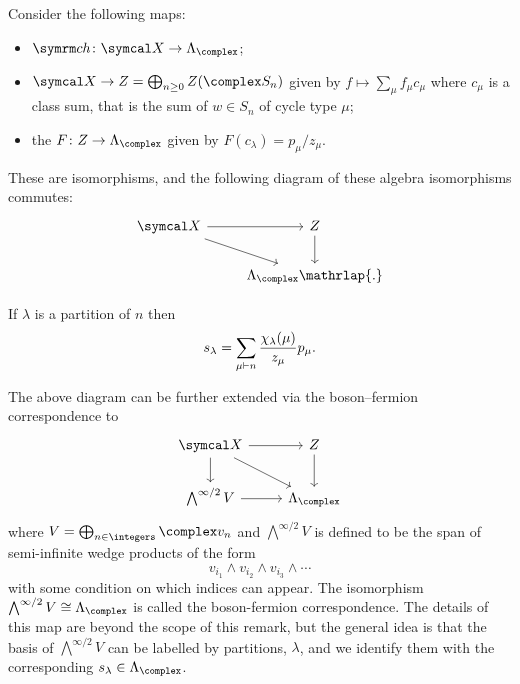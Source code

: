 \begin{thm}{}{}
    Consider the following maps:
    \begin{itemize}
        \item \(\ch \colon \classFunctions \to \Lambda_{\complex}\);
        \item \(\classFunctions \to Z = \bigoplus_{n \ge 0} Z(\complex S_n)\) given by \(f \mapsto \sum_\mu f_\mu c_\mu\) where \(c_\mu\) is a class sum, that is the sum of \(w \in S_n\) of cycle type \(\mu\);
        \item the  \(F \colon Z \to \Lambda_{\complex}\) given by \(F(c_\lambda) = p_\mu/z_\mu\).
    \end{itemize}
    These are isomorphisms, and the following diagram of these algebra isomorphisms commutes:
    \begin{equation}
        \begin{tikzcd}
            \classFunctions \arrow[r] \arrow[dr] & Z \arrow[d]\\
            & \Lambda_{\complex}\mathrlap{.}
        \end{tikzcd}
    \end{equation}
\end{thm}

\begin{crl}{}{}
    If \(\lambda\) is a partition of \(n\) then
    \begin{equation}
        s_\lambda = \sum_{\mu \vdash n} \frac{\chi_\lambda(\mu)}{z_\mu} p_\mu.
    \end{equation}
\end{crl}

\begin{remark}{}{}
    The above diagram can be further extended via the boson--fermion correspondence to
    \begin{equation}
        \begin{tikzcd}
            \classFunctions \arrow[r] \arrow[dr] \arrow[d] & Z \arrow[d]\\
            \bigwedge^{\infty/2} V \arrow[r] & \Lambda_{\complex}
        \end{tikzcd}
    \end{equation}
    where \(V = \bigoplus_{n \in \integers} \complex v_n\) and \(\bigwedge^{\infty/2}V\) is defined to be the span of semi-infinite wedge products of the form
    \begin{equation}
        v_{i_1} \wedge v_{i_2} \wedge v_{i_3} \wedge \dotsb
    \end{equation}
    with some condition on which indices can appear.
    The isomorphism \(\bigwedge^{\infty/2}V \isomorphic \Lambda_{\complex}\) is called the boson-fermion correspondence.
    The details of this map are beyond the scope of this remark, but the general idea is that the basis of \(\bigwedge^{\infty/2}V\) can be labelled by partitions, \(\lambda\), and we identify them with the corresponding \(s_\lambda \in \Lambda_{\complex}\).
\end{remark}

